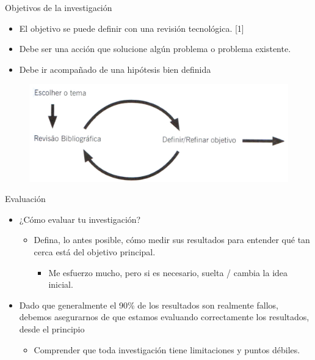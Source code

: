 \begin{frame}{Objetivos de la investigación}
\begin{block}{}
\begin{itemize}
    \item El objetivo se puede definir con una revisión tecnológica. [1]
    \item Debe ser una acción que solucione algún problema o problema existente.
    \item Debe ir acompañado de una hipótesis bien definida
\end{itemize}
\end{block}
 \begin{figure}[H]
    \includegraphics[scale=0.55]{images/figura4.PNG}
    \label{fig:boat1}
\end{figure}
\end{frame}

\begin{frame}{Evaluación}
\begin{block}{}
 \begin{itemize}
     \item ¿Cómo evaluar tu investigación?	
    \begin{itemize}
        \item Defina, lo antes posible, cómo medir sus resultados para entender qué tan cerca está del objetivo principal.
        \begin{itemize}
            \item Me esfuerzo mucho, pero si es necesario, suelta / cambia la idea inicial.
        \end{itemize}
    \end{itemize}
    \item Dado que generalmente el 90\% de los resultados son realmente fallos, debemos asegurarnos de que estamos evaluando correctamente los resultados, desde el principio
    \begin{itemize}
        \item Comprender que toda investigación tiene limitaciones y puntos débiles.
    \end{itemize}
 \end{itemize}  
 \end{block}
\end{frame}

